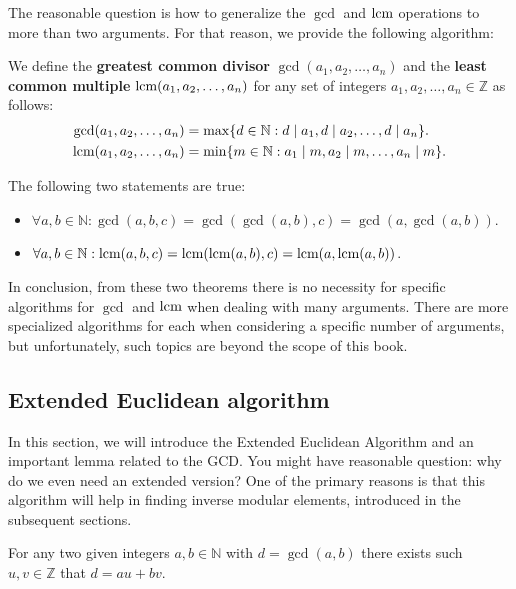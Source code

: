 \documentclass[../lecture-notes-148x210.tex]{subfiles}
\begin{document}
The reasonable question is how to generalize the $\gcd$ and $\text{lcm}$ operations to more than two arguments. 
For that reason, we provide the following algorithm:
\begin{definition}
    We define the \textbf{greatest common divisor} $\gcd(a_1, a_2, \dots, a_n)$ and the \textbf{least common multiple} $\text{lcm}(a_1, a_2, \dots, a_n)$ for any set of integers $a_1, a_2, \dots, a_n \in \mathbb{Z}$ as follows:
    \begin{align*}
        \text{gcd}(a_1, a_2, \dots, a_n) &= \max\{ d \in \mathbb{N}: d \mid a_1, d \mid a_2, \dots, d \mid a_n \}. \\
        \text{lcm}(a_1, a_2, \dots, a_n) &= \min\{ m \in \mathbb{N}: a_1 \mid m, a_2 \mid m, \dots, a_n \mid m \}.
    \end{align*}
\end{definition}

\begin{theorem}
    The following two statements are true:
    \begin{itemize}
        \item $\forall a, b \in \mathbb{N}: \gcd(a, b, c) = \gcd(\gcd(a, b), c) = \gcd(a, \gcd(a, b))$.
        \item $\forall a, b \in \mathbb{N}: \text{lcm}(a, b, c) = \text{lcm}(\text{lcm}(a, b), c) = \text{lcm}(a, \text{lcm}(a, b))$.
    \end{itemize}
\end{theorem}

In conclusion, from these two theorems there is no necessity for specific
algorithms for $\gcd$ and $\text{lcm}$ when dealing with many arguments. There are
more specialized algorithms for each when considering a specific number of
arguments, but unfortunately, such topics are beyond the scope of this book.

\subsection{Extended Euclidean algorithm}

In this section, we will introduce the Extended Euclidean Algorithm and an
important lemma related to the GCD. You might have reasonable question: why do
we even need an extended version? One of the primary reasons is that this 
algorithm will help in finding inverse modular elements, introduced in the 
subsequent sections.

\begin{lemma}  \label{lemma:bezout_identity}
    For any two given integers $a, b \in \mathbb{N}$ with $d = \gcd(a, b)$ there exists such $u, v \in \mathbb{Z}$ that $d = au + bv$.
\end{lemma}
\end{document}

